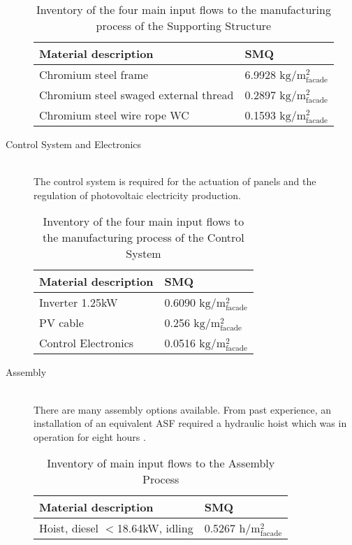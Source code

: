 \begin{description}
\begin{table}[H]
\centering
\begin{tabular}{ll}
\hline
Material description & SMQ \\ \hline
Chromium steel frame & 6.9928 ${\mathrm{kg/m^2_{facade}}}$ \\
Chromium steel swaged external thread  &0.2897 ${\mathrm{kg/m^2_{facade}}}$\\
Chromium steel wire rope WC  & 0.1593 ${\mathrm{kg/m^2_{facade}}}$\\
\hline
\end{tabular}
\caption{Inventory of the four main input flows to the manufacturing process of the Supporting Structure}
\label{tab:StructureInv}
\end{table}

\item[Control System and Electronics] \hfill \\
The control system is required for the actuation of panels and the regulation of photovoltaic electricity production.\\

\begin{table}[H]
\centering
\begin{tabular}{ll}
\hline
Material description & SMQ \\ \hline
Inverter 1.25kW	 & 0.6090 ${\mathrm{kg/m^2_{facade}}}$ \\
PV cable  &   0.256 ${\mathrm{kg/m^2_{facade}}}$\\
Control Electronics & 0.0516 ${\mathrm{kg/m^2_{facade}}}$\\
\hline
\end{tabular}
\caption{Inventory of the four main input flows to the manufacturing process of the Control System}
\label{tab:ControlInv}
\end{table}

\item[Assembly] \hfill \\
There are many assembly options available. From past experience, an installation of an equivalent ASF required a hydraulic hoist which was in operation for eight hours \cite{jayathissa2015abs}. \\

\begin{table}[H]
\centering
\begin{tabular}{ll}
\hline
Material description & SMQ \\ \hline
Hoist, diesel  ${<}$18.64kW, idling & 0.5267 ${\mathrm{h/m^2_{facade}}}$ \\
\hline
\end{tabular}
\caption{Inventory of main input flows to the Assembly Process}
\label{tab:AssemblyInv}
\end{table}

\end{description}

